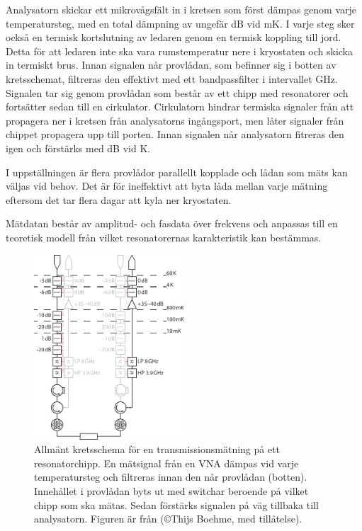 \documentclass[main.tex]{subfiles}
\begin{document}
Analysatorn skickar ett mikrovågsfält in i kretsen som först dämpas genom varje temperatursteg, med en total dämpning av ungefär \unit[67]{dB} vid \unit[10]{mK}. I varje steg sker också en termisk kortslutning av ledaren genom en termisk koppling till jord. Detta för att ledaren inte ska vara rumstemperatur nere i kryostaten och skicka in termiskt brus. Innan signalen når provlådan, som befinner sig i botten av kretsschemat, filtreras den effektivt med ett bandpassfilter i intervallet \unit[4-8]{GHz}. Signalen tar sig genom provlådan som består av ett chipp med resonatorer och fortsätter sedan till en cirkulator. Cirkulatorn hindrar termiska signaler från att propagera ner i kretsen från analysatorns ingångsport, men låter signaler från chippet propagera upp till porten. Innan signalen når analysatorn fitreras den igen och förstärks med \unit[35-40]{dB} vid \unit[4]{K}.

I uppställningen är flera provlådor parallellt kopplade och lådan som mäts kan väljas vid behov. Det är för ineffektivt att byta låda mellan varje mätning eftersom det tar flera dagar att kyla ner kryostaten.

Mätdatan består av amplitud- och fasdata över frekvens och anpassas till en teoretisk modell från vilket resonatorernas karakteristik kan bestämmas.

\begin{figure}[H]
    \centering
    \includegraphics[width=0.5\textwidth]{figure/kretsar/cryo.pdf}
    \caption{Allmänt kretsschema för en transmissionsmätning på ett resonatorchipp.
    En mätsignal från en VNA dämpas vid varje temperatursteg och filtreras innan den når provlådan (botten). Innehållet i provlådan byts ut med switchar beroende på vilket chipp som ska mätas. Sedan förstärks signalen på väg tillbaka till analysatorn. Figuren är från \cite[fig. 3.7]{Boehme2016} (\copyright Thijs Boehme, med tillåtelse).}
    \label{fig:matuppstallning}
\end{figure}
\end{document}
